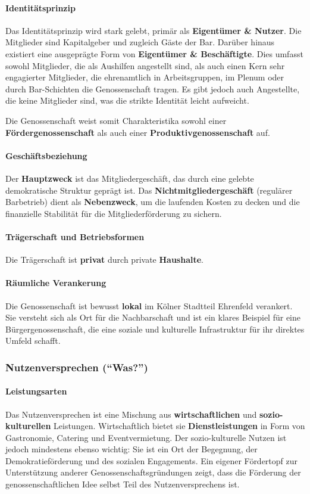 \paragraph{Identitätsprinzip}
Das Identitätsprinzip wird stark gelebt, primär als \textbf{Eigentümer \& Nutzer}. Die Mitglieder sind Kapitalgeber und zugleich Gäste der Bar. Darüber hinaus existiert eine ausgeprägte Form von \textbf{Eigentümer \& Beschäftigte}. Dies umfasst sowohl Mitglieder, die als Aushilfen angestellt sind, als auch einen Kern sehr engagierter Mitglieder, die ehrenamtlich in Arbeitsgruppen, im Plenum oder durch Bar-Schichten die Genossenschaft tragen. Es gibt jedoch auch Angestellte, die keine Mitglieder sind, was die strikte Identität leicht aufweicht.

Die Genossenschaft weist somit Charakteristika sowohl einer \textbf{Fördergenossenschaft} als auch einer \textbf{Produktivgenossenschaft} auf.

\paragraph{Geschäftsbeziehung}
Der \textbf{Hauptzweck} ist das Mitgliedergeschäft, das durch eine gelebte demokratische Struktur geprägt ist. Das \textbf{Nichtmitgliedergeschäft} (regulärer Barbetrieb) dient als \textbf{Nebenzweck}, um die laufenden Kosten zu decken und die finanzielle Stabilität für die Mitgliederförderung zu sichern.

\paragraph{Trägerschaft und Betriebsformen}
Die Trägerschaft ist \textbf{privat} durch private \textbf{Haushalte}.

\paragraph{Räumliche Verankerung}
Die Genossenschaft ist bewusst \textbf{lokal} im Kölner Stadtteil Ehrenfeld verankert. Sie versteht sich als Ort für die Nachbarschaft und ist ein klares Beispiel für eine Bürgergenossenschaft, die eine soziale und kulturelle Infrastruktur für ihr direktes Umfeld schafft.

\subsubsection{Nutzenversprechen (\enquote{Was?})}

\paragraph{Leistungsarten}
Das Nutzenversprechen ist eine Mischung aus \textbf{wirtschaftlichen} und \textbf{sozio-kulturellen} Leistungen. Wirtschaftlich bietet sie \textbf{Dienstleistungen} in Form von Gastronomie, Catering und Eventvermietung. Der sozio-kulturelle Nutzen ist jedoch mindestens ebenso wichtig: Sie ist ein Ort der Begegnung, der Demokratieförderung und des sozialen Engagements. Ein eigener Fördertopf zur Unterstützung anderer Genossenschaftsgründungen zeigt, dass die Förderung der genossenschaftlichen Idee selbst Teil des Nutzenversprechens ist.

